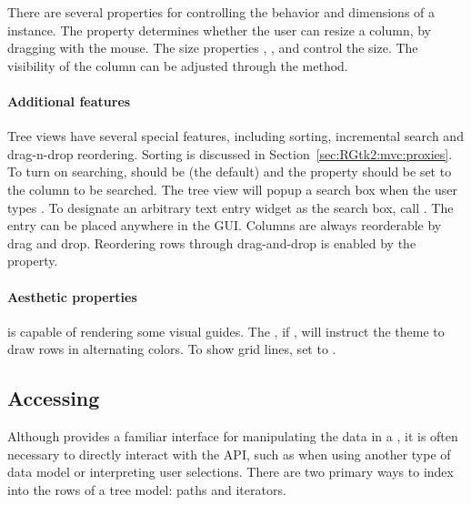There are several properties for controlling the behavior and
dimensions of a  instance. The property
 determines whether the user can resize a column, by
dragging with the mouse. The size properties ,
, and  control the size. The
visibility of the column can be adjusted through the
 method.

\paragraph{Additional features}
Tree views have several special features, including sorting,
incremental search and drag-n-drop reordering. Sorting is discussed in
Section~\ref{sec:RGtk2:mvc:proxies}. To turn on searching,
 should be  (the default) and the
 property should be set to the column to be
searched. The tree view will popup a search box when the user types
. To designate an arbitrary text entry widget as the
search box, call . The entry can
be placed anywhere in the GUI. Columns are always reorderable by drag
and drop. Reordering rows through drag-and-drop is enabled by the
 property.

\paragraph{Aesthetic properties}

 is capable of rendering some visual guides. The
, if , will instruct the theme to draw
rows in alternating colors. To show grid lines, set
 to .

\subsection{Accessing }
\label{sec:RGtk2:mvc:iterators}

Although  provides a familiar interface for
manipulating the data in a , it is often necessary
to directly interact with the \GTK\/ API, such as when using another
type of data model or interpreting user selections. There are two
primary ways to index into the rows of a tree model: paths and
iterators.

